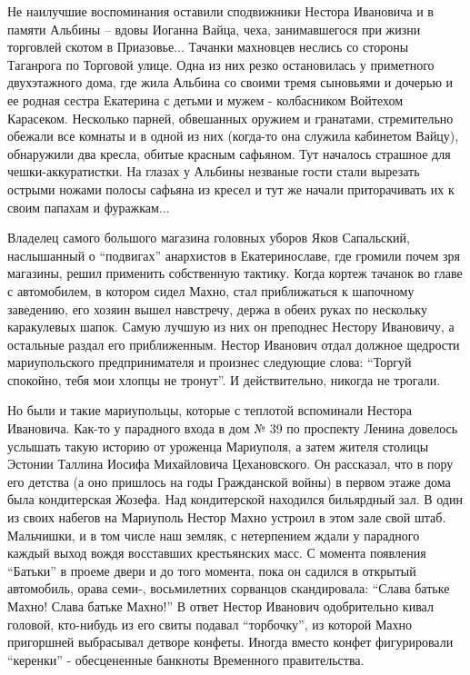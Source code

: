 Не наилучшие воспоминания оставили сподвижники Нестора Ивановича и в памяти
Альбины – вдовы Иоганна Вайца, чеха, занимавшегося при жизни торговлей скотом в
Приазовье... Тачанки махновцев неслись со стороны Таганрога по Торговой улице.
Одна из них резко остановилась у приметного двухэтажного дома, где жила Альбина
со своими тремя сыновьями и дочерью и ее родная сестра Екатерина с детьми и
мужем -  колбасником Войтехом Карасеком. Несколько парней, обвешанных оружием и
гранатами, стремительно обежали все комнаты и в одной из них (когда-то она
служила кабинетом Вайцу), обнаружили два кресла, обитые красным сафьяном. Тут
началось страшное для чешки-аккуратистки. На глазах у Альбины незваные гости
стали вырезать острыми ножами полосы сафьяна из кресел и тут же начали
приторачивать их к своим папахам и фуражкам...

Владелец самого большого магазина головных уборов Яков Сапальский, наслышанный
о \enquote{подвигах} анархистов в Екатеринославе, где громили почем зря магазины, решил
применить собственную тактику. Когда кортеж тачанок во главе с автомобилем, в
котором сидел Махно, стал приближаться к шапочному заведению, его хозяин вышел
навстречу, держа в обеих руках по нескольку каракулевых шапок. Самую лучшую из
них он преподнес Нестору Ивановичу, а остальные раздал его приближенным. Нестор
Иванович отдал должное щедрости мариупольского предпринимателя и произнес
следующие слова: \enquote{Торгуй спокойно, тебя мои хлопцы не тронут}. И действительно,
никогда не трогали.

Но были и такие мариупольцы, которые с теплотой вспоминали Нестора Ивановича.
Как-то у парадного входа в дом № 39 по проспекту Ленина довелось услышать такую
историю от уроженца Мариуполя, а затем жителя столицы Эстонии Таллина Иосифа
Михайловича Цехановского. Он рассказал, что в пору его детства (а оно пришлось
на годы Гражданской войны) в первом этаже дома была кондитерская Жозефа. Над
кондитерской находился бильярдный зал. В один из своих набегов на Мариуполь
Нестор Махно устроил в этом зале свой штаб. Мальчишки, и в том числе наш
земляк, с нетерпением ждали у парадного каждый выход вождя восставших
крестьянских масс. С момента появления \enquote{Батьки} в проеме двери и до того
момента, пока он садился в открытый автомобиль, орава семи-, восьмилетних
сорванцов скандировала: \enquote{Слава батьке Махно! Слава батьке Махно!} В ответ
Нестор Иванович одобрительно кивал головой, кто-нибудь из его свиты подавал
\enquote{торбочку}, из которой Махно пригоршней выбрасывал детворе кон­феты. Иногда
вместо конфет фигурировали \enquote{керенки} - обесцененные банкноты Временного
правительства.

